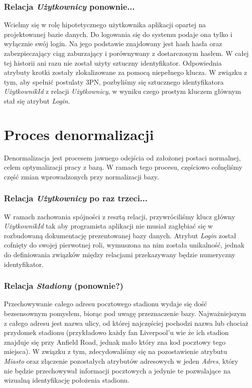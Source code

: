 \documentclass{mwrep}
\begin{document}
\subsubsection{Relacja \emph{Użytkownicy} ponownie...}
Wcielmy się w rolę hipotetycznego użytkownika aplikacji opartej na projektowanej bazie danych. Do logowania się 
do systemu podaje ona tylko i wyłącznie swój login. Na jego podstawie znajdowany jest hash hasła oraz zabezpieczający
ciąg zaburzający i porównywany z dostarczonym hasłem. W całej tej historii ani razu nie został użyty sztuczny identyfikator. 
Odpowiednia atrybuty krotki zostały zlokalizowane za pomocą niepełnego klucza. W związku z tym, aby spełnić postulaty 3PN, pozbyliśmy się
sztucznego identyfikatora \emph{UżytkownikId} z relacji \emph{Użytkownicy}, w wyniku czego prostym kluczem głównym stał się atrybut \emph{Login}.

\section{Proces denormalizacji}
Denormalizacja jest procesem jawnego odejścia od założonej postaci normalnej, celem optymalizacji pracy z bazą.
W ramach tego procesu, częściowo cofnęliśmy część zmian wprowadzonych przy normalizacji bazy.

\subsubsection{Relacja \emph{Użytkownicy} po raz trzeci...}
W ramach zachowania spójności z resztą relacji, przywróciliśmy klucz główny \emph{UżytkownikId} tak aby programista aplikacji 
nie musiał zagłębiać się w rozbudowaną dokumentację prezentowanej bazy danych. Atrybut \emph{Login} został cofnięty do swojej pierwotnej roli,
wymuszona na nim została unikalność, jednak do definiowania związków między relacjami przekazywany będzie numeryczny identyfikator.

\subsubsection{Relacja \emph{Stadiony} (ponownie?)}
Przechowywanie całego adresu pocztowego stadionu wydaje się dość bezsensownym pomysłem, biorąc pod uwagę przeznaczenie bazy. 
Najważniejszym z całego adresu jest nazwa ulicy, od której najczęściej pochodzi nazwa lub chociaż przydomek stadionu (przykładowo każdy fan 
Liverpool'u wie że ich stadion znajduje się przy Anfield Road, jednak mało który zna kod pocztowy tego miejsca). W związku z tym, zdecydowaliśmy
się na pozostawienie atrybutu \emph{Miasto} oraz złączenie pozostałych atrybutów adresowych w jeden \emph{Adres}, który nie będzie przechowywał
informacji pocztowych a jedynie te pozwalające na wizualną identyfikację położenia stadionu.
\end{document}
